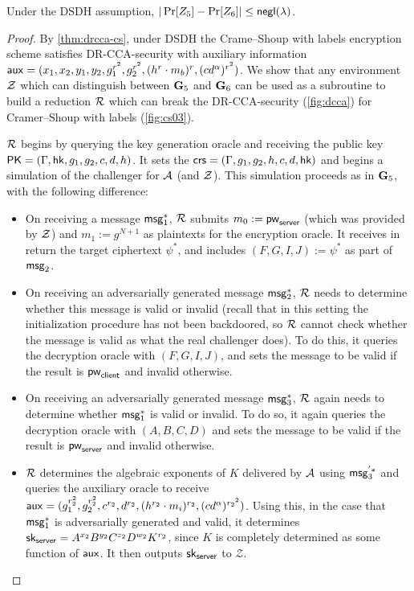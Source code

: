 \begin{lemma}
	Under the DSDH assumption, $|\Pr[Z_5]-\Pr[Z_6]|\leq\mathsf{negl}(\lambda)$.
\end{lemma}
\begin{proof}
	By \cref{thm:drcca-cs}, under DSDH the Crame--Shoup with labels encryption scheme satisfies DR-CCA-security with auxiliary information $\mathsf{aux} = (x_1,x_2,y_1,y_2,g_1^{r^2},g_2^{r^2},(h^r\cdot m_b)^{r},(cd^{\alpha})^{r^2})$. We show that any environment $\mathcal{Z}$ which can distinguish between $\mathbf{G}_5$ and $\mathbf{G}_6$ can be used as a subroutine to build a reduction $\mathcal{R}$ which can break the DR-CCA-security (\cref{fig:dcca}) for Cramer--Shoup with labels (\cref{fig:cs03}). 
	
	$\mathcal{R}$ begins by querying the key generation oracle and receiving the public key $\mathsf{PK} = (\Gamma,\mathsf{hk},g_1,g_2,c,d,h)$. It sets the $\mathsf{crs} = (\Gamma,g_1,g_2,h,c,d,\mathsf{hk})$ and begins a simulation of the challenger for $\mathcal{A}$ (and $\mathcal{Z}$). This simulation proceeds as in $\mathbf{G}_5$, with the following difference:
	
	\begin{itemize}
		\item On receiving a message $\mathsf{msg}_{1}^{*}$, $\mathcal{R}$ submits $m_0:=\mathsf{pw}_{\mathsf{server}}$ (which was provided by $\mathcal{Z}$) and $m_1:=g^{N+1}$ as plaintexts for the encryption oracle. It receives in return the target ciphertext $\psi^{*}$, and includes $(F,G,I,J):=\psi^{*}$ as part of $\mathsf{msg}_{2}$.
		\item On receiving an adversarially generated message $\mathsf{msg}_{2}^{*}$, $\mathcal{R}$ needs to determine whether this message is valid or invalid (recall that in this setting the initialization procedure has not been backdoored, so $\mathcal{R}$ cannot check whether the message is valid as what the real challenger does). To do this, it queries the decryption oracle with $(F,G,I,J)$, and sets the message to be valid if the result is $\mathsf{pw}_{\mathsf{client}}$ and invalid otherwise. 
		\item On receiving an adversarially generated message $\mathsf{msg}_{3}^{*}$, $\mathcal{R}$ again needs to determine whether $\mathsf{msg}_{1}^{*}$ is valid or invalid. To do so, it again queries the decryption oracle with $(A,B,C,D)$ and sets the message to be valid if the result is $\mathsf{pw}_{\mathsf{server}}$ and invalid otherwise.
		\item $\mathcal{R}$ determines the algebraic exponents of $K$ delivered by $\mathcal{A}$ using $\mathsf{msg}_{3}^{'*}$ and queries the auxiliary oracle to receive $\mathsf{aux} = (g_1^{r_2^2}, g_2^{r_2^2}, c^{r_2}, d^{r_2},(h^{r_2}\cdot m_i)^{r_2},(cd^{\alpha})^{{r_2}^2})$. Using this, in the case that $\mathsf{msg}_{1}^{*}$ is adversarially generated and valid, it determines $\mathsf{sk}_{\mathsf{server}} = A^{x_2}B^{y_2}C^{z_2}D^{w_2}K^{r_2}$, since $K$ is completely determined as some function of $\mathsf{aux}$. It then outputs $\mathsf{sk}_{\mathsf{server}}$ to $\mathcal{Z}$. 
	\end{itemize}


\end{proof}
